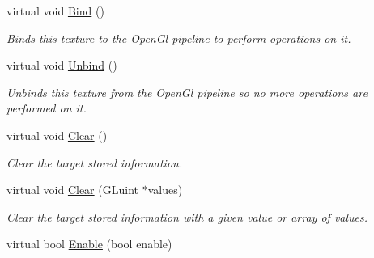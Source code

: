 \begin{DoxyCompactItemize}
\mbox{\label{class_geometry_engine_1_1_geometry_buffer_1_1_g_texture_a997bf664c4e87802feb1547e62682aa6}} 
virtual void \mbox{\hyperlink{class_geometry_engine_1_1_geometry_buffer_1_1_g_texture_a997bf664c4e87802feb1547e62682aa6}{Bind}} ()
\begin{DoxyCompactList}\small\item\em Binds this texture to the Open\+Gl pipeline to perform operations on it. \end{DoxyCompactList}\item 
\mbox{\label{class_geometry_engine_1_1_geometry_buffer_1_1_g_texture_a8f5f6ade8bb05e15d9d790f1de60ec69}} 
virtual void \mbox{\hyperlink{class_geometry_engine_1_1_geometry_buffer_1_1_g_texture_a8f5f6ade8bb05e15d9d790f1de60ec69}{Unbind}} ()
\begin{DoxyCompactList}\small\item\em Unbinds this texture from the Open\+Gl pipeline so no more operations are performed on it. \end{DoxyCompactList}\item 
\mbox{\label{class_geometry_engine_1_1_geometry_buffer_1_1_g_texture_ac3ce04092fc1ef08ae4fb9da935b702d}} 
virtual void \mbox{\hyperlink{class_geometry_engine_1_1_geometry_buffer_1_1_g_texture_ac3ce04092fc1ef08ae4fb9da935b702d}{Clear}} ()
\begin{DoxyCompactList}\small\item\em Clear the target stored information. \end{DoxyCompactList}\item 
\mbox{\label{class_geometry_engine_1_1_geometry_buffer_1_1_g_texture_ab0916f94bc86212ffcc5e3c7553ef3b1}} 
virtual void \mbox{\hyperlink{class_geometry_engine_1_1_geometry_buffer_1_1_g_texture_ab0916f94bc86212ffcc5e3c7553ef3b1}{Clear}} (G\+Luint $\ast$values)
\begin{DoxyCompactList}\small\item\em Clear the target stored information with a given value or array of values. \end{DoxyCompactList}\item 
virtual bool \mbox{\hyperlink{class_geometry_engine_1_1_geometry_buffer_1_1_g_texture_a528604f22629785271b3f36ec18ffc78}{Enable}} (bool enable)

\end{DoxyCompactItemize}
